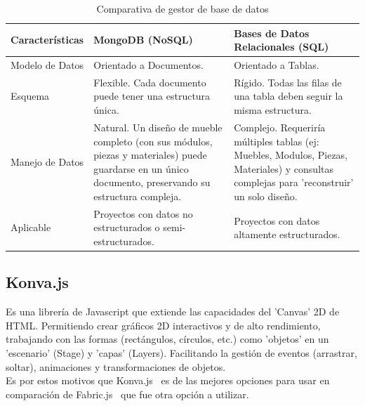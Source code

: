 ﻿\documentclass{iccmemoria}
\begin{document}
\begin{table}[H]
    \centering
    \caption{Comparativa de gestor de base de datos}
    \label{tab:comparativa_Base_de_datos} %
    \begin{tabular}{|p{3.5cm}|p{5cm}|p{5cm}|} 
        \hline %
        \textbf{Características} & \textbf{MongoDB (NoSQL)} & \textbf{Bases de Datos Relacionales (SQL)}\\
        \hline %
        

Modelo de Datos & Orientado a Documentos.& Orientado a Tablas.\\
\hline
Esquema & Flexible. Cada documento puede tener una estructura única. & Rígido. Todas las filas de una tabla deben seguir la misma estructura.\\
\hline
Manejo de Datos & Natural. Un diseño de mueble completo (con sus módulos, piezas y materiales) puede guardarse en un único documento, preservando su estructura compleja. & Complejo. Requeriría múltiples tablas (ej: Muebles, Modulos, Piezas, Materiales) y consultas complejas para 'reconstruir' un solo diseño.\\
\hline
Aplicable & Proyectos con datos no estructurados o semi-estructurados. & Proyectos con datos altamente estructurados.\\        
        \hline %
    \end{tabular}
\end{table}

    \subsection{Konva.js}
    Es una librería de Javascript que extiende las capacidades del 'Canvas' 2D de HTML. Permitiendo crear gráficos 2D interactivos y de alto rendimiento, trabajando con las formas (rectángulos, círculos, etc.) como 'objetos' en un 'escenario' (Stage) y 'capas' (Layers). Facilitando la gestión de eventos (arrastrar, soltar), animaciones y transformaciones de objetos.\\
    Es por estos motivos que Konva.js~\cite{konva} es de las mejores opciones para usar en comparación de Fabric.js~\cite{fabricjs} que fue otra opción a utilizar.
\end{document}
